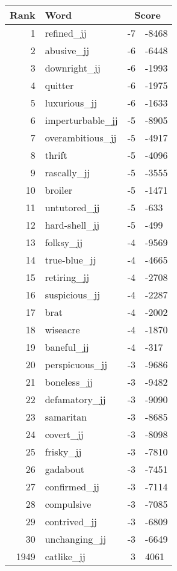 \begin{longtable}[!htbp]{| rlr@{.}l |}
    \hline
    \textbf{Rank} & \textbf{Word} & \multicolumn{2}{c|}{\textbf{Score}} \\
    \hline
    \endhead
    1 & refined\_jj & -7 & -8468 \\
    2 & abusive\_jj & -6 & -6448 \\
    3 & downright\_jj & -6 & -1993 \\
    4 & quitter & -6 & -1975 \\
    5 & luxurious\_jj & -6 & -1633 \\
    6 & imperturbable\_jj & -5 & -8905 \\
    7 & overambitious\_jj & -5 & -4917 \\
    8 & thrift & -5 & -4096 \\
    9 & rascally\_jj & -5 & -3555 \\
    10 & broiler & -5 & -1471 \\
    11 & untutored\_jj & -5 & -633 \\
    12 & hard-shell\_jj & -5 & -499 \\
    13 & folksy\_jj & -4 & -9569 \\
    14 & true-blue\_jj & -4 & -4665 \\
    15 & retiring\_jj & -4 & -2708 \\
    16 & suspicious\_jj & -4 & -2287 \\
    17 & brat & -4 & -2002 \\
    18 & wiseacre & -4 & -1870 \\
    19 & baneful\_jj & -4 & -317 \\
    20 & perspicuous\_jj & -3 & -9686 \\
    21 & boneless\_jj & -3 & -9482 \\
    22 & defamatory\_jj & -3 & -9090 \\
    23 & samaritan & -3 & -8685 \\
    24 & covert\_jj & -3 & -8098 \\
    25 & frisky\_jj & -3 & -7810 \\
    26 & gadabout & -3 & -7451 \\
    27 & confirmed\_jj & -3 & -7114 \\
    28 & compulsive & -3 & -7085 \\
    29 & contrived\_jj & -3 & -6809 \\
    30 & unchanging\_jj & -3 & -6649 \\
    1949 & catlike\_jj & 3 & 4061 \\

\end{longtable}
